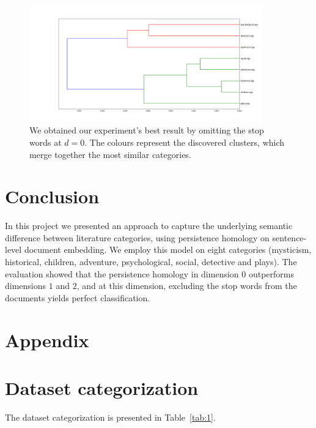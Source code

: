 \documentclass[fleqn]{article}
\begin{document}
	\begin{figure}
		\centering
		\includegraphics[width=0.9\textwidth]{figures/stopwords_excluded/dendrogram_d0.png}
		\caption{We obtained our experiment's best result by omitting the stop words at $d = 0$. The colours represent the discovered clusters, which merge together the most similar categories.}
		\label{fig:winner}
	\end{figure}
	
	\section{Conclusion} \label{conclusion}
	In this project we presented an approach to capture the underlying semantic difference between literature categories, using persistence homology on sentence-level document embedding. We employ this model on eight categories (mysticism, historical, children, adventure, psychological, social, detective and plays). The evaluation showed that the persistence homology in dimension $0$ outperforms dimensions $1$ and $2$, and at this dimension, excluding the stop words from the documents yields perfect classification.
	
	\section*{Appendix} \label{appendix}
	\appendix
	\section{Dataset categorization} \label{app:dataset}
	The dataset categorization is presented in Table~\ref{tab:1}.
	
\end{document}
